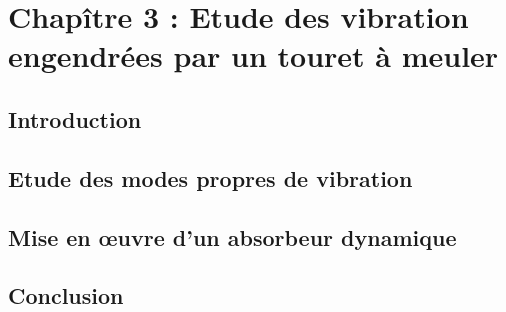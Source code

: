 \documentclass[10pt,a4paper, french]{article}
\begin{document}
\newpage


%




\section{Chapître 3 : Etude des vibration engendrées par un touret à meuler}

\subsection{Introduction}
\subsection{Etude des modes propres de vibration}
\subsection{Mise en œuvre d'un absorbeur dynamique}
\subsection{Conclusion}
\end{document}
